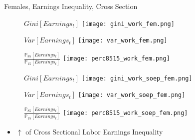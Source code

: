 \documentclass{beamer}
\begin{document}
\begin{frame}{Females, Earnings Inequality, Cross Section}
\begin{figure}[!t]
\centering
\begin{minipage}[b]{0.32\textwidth}{$Gini[Earnings_t]$}
\centering
\texttt{[image: gini\_work\_fem.png]}
\end{minipage}
\begin{minipage}[b]{0.32\textwidth}{$Var[Earnings_t]$}
\centering
\texttt{[image: var\_work\_fem.png]}
\end{minipage}
\begin{minipage}[b]{0.32\textwidth}{$\frac{\mathbb{P}_{85}[Earnings_t]}{\mathbb{P}_{15}[Earnings_t]}$}
\centering
\texttt{[image: perc8515\_work\_fem.png]}
\end{minipage}
\end{figure}
\begin{figure}[!t]
\centering
\begin{minipage}[b]{0.32\textwidth}{$Gini[Earnings_t]$}
\centering
\texttt{[image: gini\_work\_soep\_fem.png]}
\end{minipage}
\begin{minipage}[b]{0.32\textwidth}{$Var[Earnings_t]$}
\centering
\texttt{[image: var\_work\_soep\_fem.png]}
\end{minipage}
\begin{minipage}[b]{0.32\textwidth}{$\frac{\mathbb{P}_{85}[Earnings_t]}{\mathbb{P}_{15}[Earnings_t]}$}
\centering
\texttt{[image: perc8515\_work\_soep\_fem.png]}
\end{minipage}
\end{figure}
\begin{itemize}
\setlength{\itemsep}{0.7 cm}
\item $\uparrow$ of Cross Sectional Labor Earnings Inequality
\end{itemize}
\end{frame}
\end{document}
